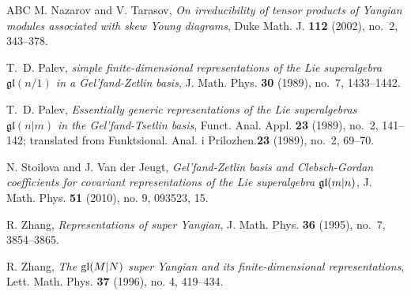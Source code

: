 \documentclass[12pt]{amsart}
\begin{document}
\begin{thebibliography}{ABC}
{M. Nazarov and V. Tarasov},
{\it On irreducibility of tensor products of Yangian modules associated with skew Young diagrams},
Duke Math. J. {\bf 112} (2002), no.~2, 343--378.

T.~D. Palev,
{\it simple finite-dimensional representations of the Lie superalgebra {$\mathfrak{gl}(n/1)$} in a Gel'fand-Zetlin basis},
J. Math. Phys. {\bf 30} (1989), no.~7, 1433--1442.

T.~D. Palev,
{\it Essentially generic representations of the Lie superalgebras $\mathfrak{gl}(n|m)$ in the Gel'fand-Tsetlin basis},
Funct. Anal. Appl.
{\bf 23} (1989), no.~2, 141--142; translated from Funktsional. Anal. i Prilozhen.{\bf 23} (1989), no.~2, 69--70.

{N. Stoilova and J. Van der Jeugt},
{\it  Gel'fand-{Z}etlin basis and {C}lebsch-{G}ordan coefficients for covariant representations of the {L}ie superalgebra {$\mathfrak{gl}(m|n)$}},
J. Math. Phys. {\bf 51} (2010), no. 9, 093523, 15.

{R. Zhang},
{\it Representations of super Yangian},
J. Math. Phys. {\bf 36} (1995), no.~7, 3854--3865.

{R. Zhang},
{\it  The {${\rm gl}(M|N)$} super {Y}angian and its finite-dimensional representations},
Lett. Math. Phys. {\bf 37} (1996), no. 4, 419--434.

\end{thebibliography}
\end{document}

